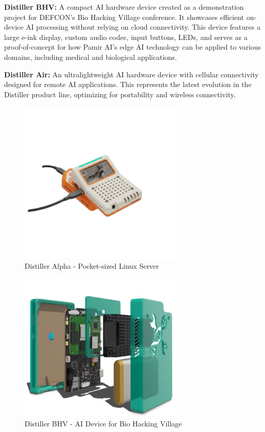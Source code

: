 \documentclass[12pt,a4paper]{report}
\begin{document}
\vspace{0.3cm}

\textbf{Distiller BHV:} A compact AI hardware device created as a demonstration project for DEFCON's Bio Hacking Village conference. It showcases efficient on-device AI processing without relying on cloud connectivity. This device features a large e-ink display, custom audio codec, input buttons, LEDs, and serves as a proof-of-concept for how Pamir AI's edge AI technology can be applied to various domains, including medical and biological applications.

\vspace{0.3cm}

\textbf{Distiller Air:} An ultralightweight AI hardware device with cellular connectivity designed for remote AI applications. This represents the latest evolution in the Distiller product line, optimizing for portability and wireless connectivity.

\begin{figure}[htbp]
    \centering
    \includegraphics[width=0.7\textwidth]{distiller_alpha.png}
    \caption{Distiller Alpha - Pocket-sized Linux Server}
\end{figure}

\vspace{0.5cm}

\begin{figure}[htbp]
    \centering
    \includegraphics[width=0.7\textwidth]{distiller_bhv.pdf}
    \caption{Distiller BHV - AI Device for Bio Hacking Village}
\end{figure}
\end{document}
